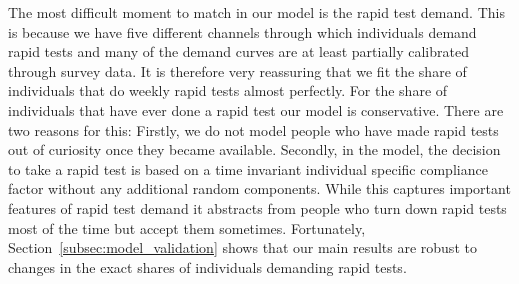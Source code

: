The most difficult moment to match in our model is the rapid test demand. This is because
we have five different channels through which individuals demand rapid tests and many of
the demand curves are at least partially calibrated through survey data. It is therefore
very reassuring that we fit the share of individuals that do weekly rapid tests almost
perfectly. For the share of individuals that have ever done a rapid test our model is
conservative. There are two reasons for this: Firstly, we do not model people who have
made rapid tests out of curiosity once they became available. Secondly, in the model, the
decision to take a rapid test is based on a time invariant individual specific compliance
factor without any additional random components. While this captures important features
of rapid test demand it abstracts from people who turn down rapid tests most of the time
but accept them sometimes. Fortunately, Section~\ref{subsec:model_validation} shows that
our main results are robust to changes in the exact shares of individuals demanding rapid
tests.

